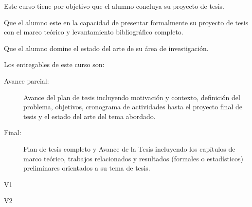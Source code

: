\begin{syllabus}


\begin{justification}
Este curso tiene por objetivo que el alumno concluya su proyecto de tesis.
\end{justification}

\begin{goals}
\item Que el alumno este en la capacidad de presentar formalmente su proyecto de tesis con el marco teórico y levantamiento bibliográfico completo.
\item Que el alumno domine el estado del arte de su área de investigación.
\item Los entregables de este curso son:
	\begin{description}
	\item [Avance parcial:] Avance del plan de tesis incluyendo motivación y contexto, definición del problema, objetivos, cronograma de actividades hasta el proyecto final de tesis y el estado del arte del tema abordado.
	\item [Final:] Plan de tesis completo y Avance de la Tesis incluyendo los capítulos de marco teórico, trabajos relacionados y resultados (formales o estadísticos) preliminares orientados a su tema de tesis.
	\end{description}
\end{goals}

\begin{outcomes}{V1}
\item {}
\item {}
\item {}
\item {}
\item {}
\item {}
\item {}
\item {}
\end{outcomes}

\begin{outcomes}{V2}
\item {}
\item {}
\item {}
\item {}
\end{outcomes}


\end{syllabus}

